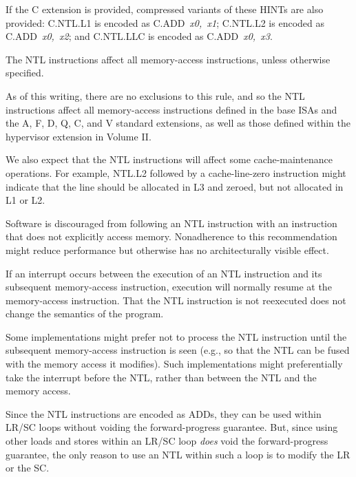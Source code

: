 If the C extension is provided, compressed variants of these HINTs are also
provided:
C.NTL.L1 is encoded as \mbox{C.ADD {\em x0, x1}};
C.NTL.L2 is encoded as \mbox{C.ADD {\em x0, x2}};
and C.NTL.LLC is encoded as \mbox{C.ADD {\em x0, x3}}.


The NTL instructions affect all memory-access instructions, unless otherwise
specified.

\begin{commentary}
As of this writing, there are no exclusions to this rule, and so
the NTL instructions affect all memory-access instructions
defined in the base ISAs and the A, F, D, Q, C, and V standard extensions,
as well as those defined within the hypervisor extension in Volume II.

We also expect that the NTL instructions will affect some cache-maintenance
operations.
For example, NTL.L2 followed by a cache-line-zero instruction might indicate
that the line should be allocated in L3 and zeroed, but not allocated in
L1 or L2.
\end{commentary}

Software is discouraged from following an NTL instruction with an
instruction that does not explicitly access memory.
Nonadherence to this recommendation might reduce performance but
otherwise has no architecturally visible effect.

\begin{commentary}
If an interrupt occurs between the execution of an NTL instruction and its
subsequent memory-access instruction, execution will normally resume at the
memory-access instruction.
That the NTL instruction is not reexecuted does not change the semantics of
the program.

Some implementations might prefer not to process the NTL instruction until the
subsequent memory-access instruction is seen (e.g., so that the NTL can be
fused with the memory access it modifies).
Such implementations might preferentially take the interrupt before the NTL,
rather than between the NTL and the memory access.
\end{commentary}

\begin{commentary}
Since the NTL instructions are encoded as ADDs, they can be used within LR/SC
loops without voiding the forward-progress guarantee.
But, since using other loads and stores within an LR/SC loop {\em does}
void the forward-progress guarantee, the only reason to use an NTL
within such a loop is to modify the LR or the SC.
\end{commentary}
